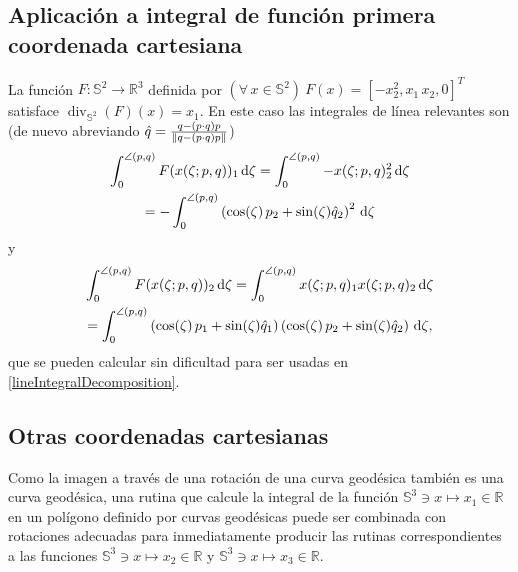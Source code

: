\documentclass[reqno]{amsart}
\newcommand{\dd}[1][y]{\if#1y\,\fi{\mathrm d}} %
\newcommand{\norm}[2][y]{\if#1y\left\fi\lVert#2\if#1y\right\fi\rVert} %
\begin{document}
\subsection{Aplicación a integral de función primera coordenada cartesiana}
La función $F \colon \mathbb{S}^2 \to \mathbb{R}^3$ definida por $(\forall\,x \in\mathbb{S}^2)\ F(x) = [-x_2^2, x_1\,x_2, 0]^T$ satisface $\operatorname{div}_{\mathbb{S}^2}(F)(x) = x_1$.
En este caso las integrales de línea relevantes son (de nuevo abreviando $\hat q = \frac{q - (p\cdot q)p}{\norm{q - (p\cdot q)p}}$)
%
\begin{multline}\label{aux-x1-1}
\int_0^{\angle(p,q)} F(x(\zeta;p,q))_1 \dd \zeta
= \int_0^{\angle(p,q)} -x(\zeta;p,q)_2^2 \dd \zeta\\
= -\int_0^{\angle(p,q)} \left( \cos(\zeta) \, p_2 + \sin(\zeta) \hat q_2 \right)^2 \dd \zeta
\end{multline}
%
y
%
\begin{multline}\label{aux-x1-2}
\int_0^{\angle(p,q)} F(x(\zeta;p,q))_2 \dd \zeta
= \int_0^{\angle(p,q)} x(\zeta;p,q)_1 x(\zeta;p,q)_2 \dd \zeta\\
= \int_0^{\angle(p,q)} \left( \cos(\zeta) \, p_1 + \sin(\zeta) \hat q_1 \right) \left( \cos(\zeta) \, p_2 + \sin(\zeta) \hat q_2 \right) \dd \zeta,
\end{multline}
%
que se pueden calcular sin dificultad para ser usadas en \eqref{lineIntegralDecomposition}.

\subsection{Otras coordenadas cartesianas}

Como la imagen a través de una rotación de una curva geodésica también es una curva geodésica, una rutina que calcule la integral de la función $\mathbb{S}^3 \ni x \mapsto x_1 \in \mathbb{R}$ en un polígono definido por curvas geodésicas puede ser combinada con rotaciones adecuadas para inmediatamente producir las rutinas correspondientes a las funciones $\mathbb{S}^3 \ni x \mapsto x_2 \in \mathbb{R}$ y $\mathbb{S}^3 \ni x \mapsto x_3 \in \mathbb{R}$.
\end{document}
